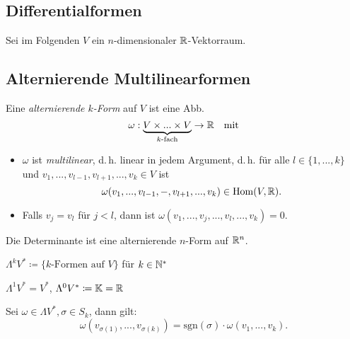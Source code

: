 \documentclass{cheat-sheet}
\begin{document}
\begin{samepage}

\section{Differentialformen}

\begin{nota}
  Sei im Folgenden $V$ ein $n$-dimensionaler $\mathbb{R}$-Vektorraum.
\end{nota}

\subsection{Alternierende Multilinearformen}

\begin{defn}
  Eine \emph{alternierende $k$-Form} auf $V$ ist eine Abb.
  \[ \omega : \underbrace{V \times ... \times V}_{\text{$k$-fach}} \to \mathbb{R} \quad \text{mit} \]
  \begin{itemize}
    \item $\omega$ ist \emph{multilinear}, d.\,h. linear in jedem Argument, d.\,h. für alle $l \in \{ 1, ..., k \}$ und $v_1, ..., v_{l-1}, v_{l+1}, ..., v_k \in V$ ist
    \[ \omega(v_1, ..., v_{l-1}, -, v_{l+1}, ..., v_k) \in \mathrm{Hom}(V, \mathbb{R}). \]
    \item Falls $v_j = v_l$ für $j < l$, dann ist $\omega(v_1, ..., v_j, ..., v_l, ..., v_k) = 0$.
  \end{itemize}
\end{defn}

\begin{bsp}
  Die Determinante ist eine alternierende $n$-Form auf $\mathbb{R}^n$.
\end{bsp}

\begin{nota}
  $\Lambda^k V^* \coloneqq \{ \text{$k$-Formen auf $V$} \}$ für $k \in \mathbb{N}^*$
\end{nota}

\begin{bem}
  $\Lambda^1 V^* = V^*$, $\Lambda^0 V^* \coloneqq \mathbb{K} = \mathbb{R}$
\end{bem}

\begin{lem}
  Sei $\omega \in \Lambda V^*, \sigma \in S_k$, dann gilt:
  \[ \omega(v_{\sigma(1)}, ..., v_{\sigma(k)}) = \mathrm{sgn}(\sigma) \cdot \omega(v_1, ..., v_k). \]
\end{lem}

\end{samepage}
\end{document}
